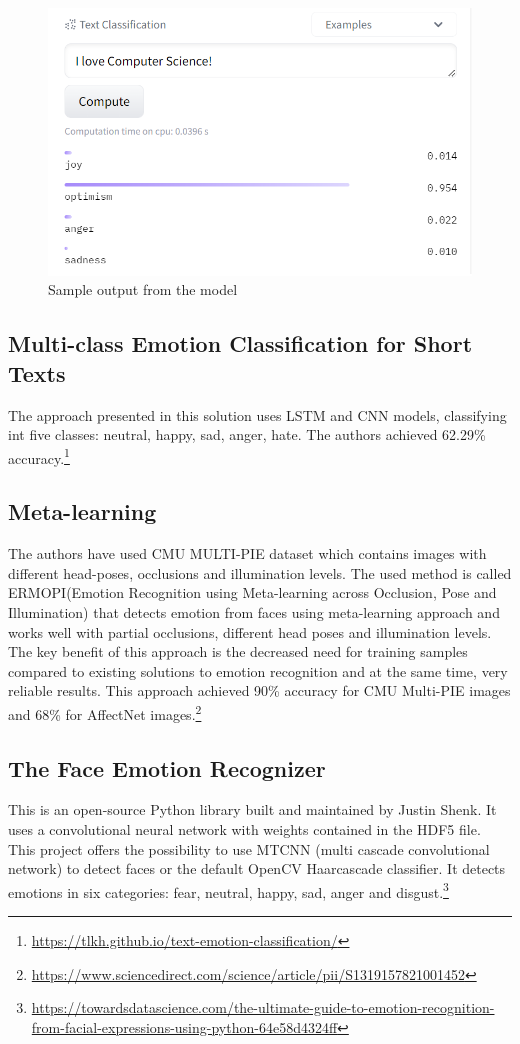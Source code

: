\documentclass{ledger}
\begin{document}
\begin{figure}[H]
	\centering
	\includegraphics[width=1\textwidth]{assets/roberta.png}
	\caption{Sample output from the model}
	\label{fig:goemotions-classes}
\end{figure}
\subsection{Multi-class Emotion Classification for Short Texts}
The approach presented in this solution uses LSTM and CNN models, classifying int five classes: neutral, happy, sad, anger, hate. The authors achieved 62.29\% accuracy.\footnote[2]{\url{https://tlkh.github.io/text-emotion-classification/}}

\subsection{Meta-learning}
The authors have used CMU MULTI-PIE dataset which contains images with different head-poses, occlusions and illumination levels. The used method is called ERMOPI(Emotion Recognition using Meta-learning across Occlusion, Pose and Illumination) that detects emotion from faces using meta-learning approach and works well with partial occlusions, different head poses and illumination levels. The key benefit of this approach is the decreased need for training samples compared to existing solutions to emotion recognition and at the same time, very reliable results. This approach achieved 90\% accuracy for CMU Multi-PIE images and 68\% for AffectNet images.\footnote[3]{\url{https://www.sciencedirect.com/science/article/pii/S1319157821001452}}

\subsection{The Face Emotion Recognizer}
This is an open-source Python library built and maintained by Justin Shenk. It uses a convolutional neural network with weights contained in the HDF5 file. This project offers the possibility to use MTCNN (multi cascade convolutional network) to detect faces or the default OpenCV Haarcascade classifier. It detects emotions in six categories: fear, neutral, happy, sad, anger and disgust.\footnote[1]{\url{https://towardsdatascience.com/the-ultimate-guide-to-emotion-recognition-from-facial-expressions-using-python-64e58d4324ff}}
\end{document}
